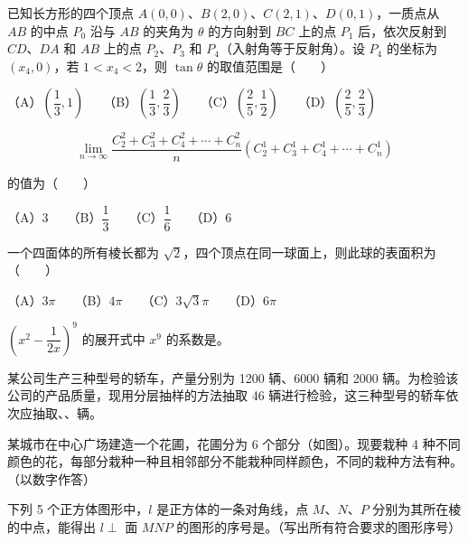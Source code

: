 \begin{question}
已知长方形的四个顶点 $A(0,0)\text{、}B(2,0)\text{、}C(2,1)\text{、}D(0,1)$，一质点从 $AB$ 的中点 $P_0$ 沿与 $AB$ 的夹角为 $\theta$ 的方向射到 $BC$ 上的点 $P_1$ 后，依次反射到 $CD\text{、}DA$ 和 $AB$ 上的点 $P_2\text{、}P_3$ 和 $P_4$（入射角等于反射角）。设 $P_4$ 的坐标为 $(x_4,0)$，若 $1<x_4<2$，则 $\tan\theta$ 的取值范围是\mbox{（　　）}

（A）$\left(\dfrac13,1\right)$　　（B）$\left(\dfrac13,\dfrac23\right)$　　（C）$\left(\dfrac25,\dfrac12\right)$　　（D）$\left(\dfrac25,\dfrac23\right)$

\end{question}
\begin{question}

\nopagebreak[4]
\[
\lim_{n\to\infty}
\frac{C_2^2+C_3^2+C_4^2+\cdots+C_n^2}
n(C_2^1+C_3^1+C_4^1+\cdots+C_n^1)
\]

的值为\mbox{（　　）}

（A）$3$　　（B）$\dfrac13$　　（C）$\dfrac16$　　（D）$6$

\end{question}
\begin{question}
一个四面体的所有棱长都为 $\sqrt2$，四个顶点在同一球面上，则此球的表面积为\mbox{（　　）}

（A）$3\pi$　　（B）$4\pi$　　（C）$3\sqrt3\pi$　　（D）$6\pi$

\end{question}

\begin{question}
$\left(x^2-\dfrac1{2x}\right)^9$ 的展开式中 $x^9$ 的系数是\gkblank{}。

\end{question}
\begin{question}
某公司生产三种型号的轿车，产量分别为 1200 辆、6000 辆和 2000 辆。为检验该公司的产品质量，现用分层抽样的方法抽取 46 辆进行检验，这三种型号的轿车依次应抽取\gkblank{}、\gkblank{}、\gkblank{}辆。

\Needspace{0.4\textheight}
\end{question}
\begin{question}
某城市在中心广场建造一个花圃，花圃分为 6 个部分（如图）。现要栽种 4 种不同颜色的花，每部分栽种一种且相邻部分不能栽种同样颜色，不同的栽种方法有\gkblank{}种。（以数字作答）
\nopagebreak[4]
\begin{center}\end{center}
\nopagebreak[4]
\Needspace{0.4\textheight}
\end{question}
\begin{question}
下列 5 个正方体图形中，$l$ 是正方体的一条对角线，点 $M\text{、}N\text{、}P$ 分别为其所在棱的中点，能得出 $l\perp$ 面 $MNP$ 的图形的序号是\gkblank{}。（写出所有符合要求的图形序号）
\nopagebreak[4]
\begin{center}\end{center}
\nopagebreak[4]
\end{question}

